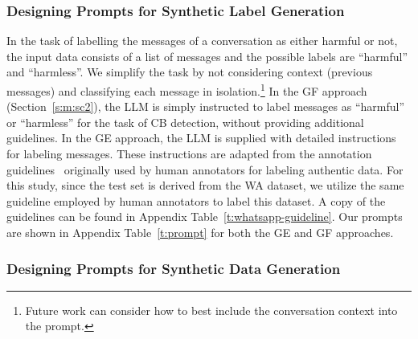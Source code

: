 \subsubsection{Designing Prompts for Synthetic Label Generation}

In the task of labelling the messages of a conversation as either harmful or not, the input data consists of a list of messages and the possible labels are ``harmful'' and ``harmless''.
We simplify the task by not considering context (previous messages) and classifying each message in isolation.\footnote{Future work can consider how to best include the conversation context into the prompt.}
In the GF approach (Section~\ref{s:m:sc2}), the LLM is simply instructed to label messages as ``harmful'' or ``harmless'' for the task of CB detection, without providing additional guidelines. In the GE approach, the LLM is supplied with detailed instructions for labeling messages. These instructions are adapted from the annotation guidelines~\cite{van-hee-et-al-2015-guidelines} originally used by human annotators for labeling authentic data.
For this study, since the test set is derived from the WA dataset, we utilize the same guideline employed by human annotators to label this dataset.
A copy of the guidelines can be found in Appendix Table~\ref{t:whatsapp-guideline}.
Our prompts are shown in Appendix Table~\ref{t:prompt}
for both the GE and GF approaches.


\subsubsection{Designing Prompts for Synthetic Data Generation}

